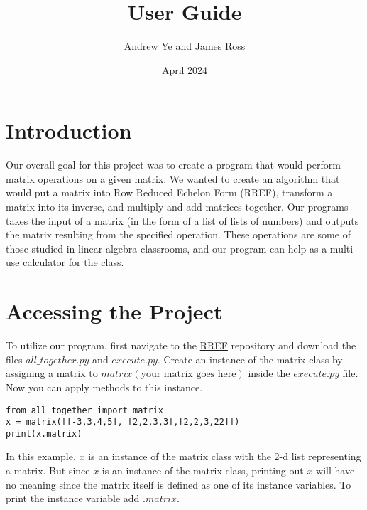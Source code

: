 \documentclass{article}
\title{User Guide}
\author{Andrew Ye and James Ross}
\date{April 2024}
\begin{document}
\maketitle
\newpage
\tableofcontents
\newpage

\section{Introduction}
Our overall goal for this project was to create a program that would perform matrix operations on a given matrix. We wanted to create an algorithm that would put a matrix into Row Reduced Echelon Form (RREF), transform a matrix into its inverse, and multiply and add matrices together. Our programs takes the input of a matrix (in the form of a list of lists of numbers) and outputs the matrix resulting from the specified operation. These operations are some of those studied in linear algebra classrooms, and our program can help as a multi-use calculator for the class.

\section{Accessing the Project}
To utilize our program, first navigate to the \href{https://github.com/AndrewYe12/RREF}{RREF} repository and download the files \(all\_together.py\) and \(execute.py\). 
Create an instance of the matrix class by assigning a matrix to \(matrix(\text{your matrix goes here})\) inside the \(execute.py\) file. Now you can apply methods to this instance. 
\begin{lstlisting}
from all_together import matrix
x = matrix([[-3,3,4,5], [2,2,3,3],[2,2,3,22]])
print(x.matrix) 
\end{lstlisting}
In this example, \(x\) is an instance of the matrix class with the 2-d list representing a matrix. But since \(x\) is an instance of the matrix class, printing out \(x\) will have no meaning since the matrix itself is defined as one of its instance variables. To print the instance variable add \(.matrix\). 
\end{document}
